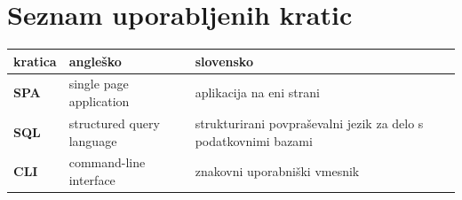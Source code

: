 \documentclass[a4paper, 12pt]{book}
\newcommand{\clearemptydoublepage}{\newpage{\pagestyle{empty}\cleardoublepage}}
\begin{document}
\clearemptydoublepage


\pagestyle{empty}
\def\thepage{}%
\tableofcontents{}

\clearemptydoublepage


\chapter*{Seznam uporabljenih kratic}  %

\noindent\begin{tabular}{p{}|p{}|p{}}    %
  {\bf kratica} & {\bf angleško}                             & {\bf slovensko} \\ \hline
  {\bf SPA}      & single page application               &  aplikacija na eni strani \\
  {\bf SQL} & structured query language & strukturirani povpraševalni jezik za delo s podatkovnimi bazami  \\
  {\bf CLI}   & command-line interface              & znakovni uporabniški vmesnik \\
\end{tabular}
\end{document}
